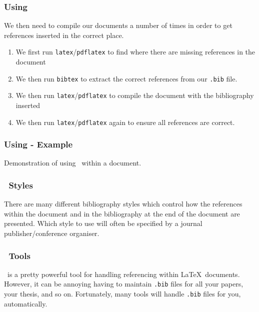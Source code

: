 \documentclass[mathserif]{beamer}
\begin{document}
\begin{frame}[fragile]
\frametitle{Using \BibTeX}

\vfill
We then need to compile our documents a number of times in order to get references inserted in the correct place.
\begin{enumerate}
	\item We first run \texttt{latex}/\texttt{pdflatex} to find where there are missing references in the document
	\item We then run \texttt{bibtex} to extract the correct references from our \texttt{.bib} file.
	\item We then run \texttt{latex}/\texttt{pdflatex} to compile the document with the bibliography inserted
	\item We then run \texttt{latex}/\texttt{pdflatex} again to ensure all references are correct.
\end{enumerate}
\vfill

\end{frame}


\begin{frame}[fragile]
\frametitle{Using \BibTeX - Example}

\vfill
Demonstration of using \BibTeX\ within a document.
\vfill

\end{frame}

\begin{frame}[fragile]
\frametitle{\BibTeX\ Styles}

\vfill
There are many different bibliography styles which control how the references within the document and in the bibliography at the end of the document are presented.
\vfill
Which style to use will often be specified by a journal publisher/conference organiser.
\vfill

\end{frame}

\begin{frame}[fragile]
\frametitle{\BibTeX\ Tools}

\vfill
\BibTeX\ is a pretty powerful tool for handling referencing within \LaTeX\ documents.
\vfill
However, it can be annoying having to maintain \texttt{.bib} files for all your papers, your thesis, and so on.
\vfill
Fortunately, many tools will handle \texttt{.bib} files for you, automatically.
\vfill

\end{frame}
\end{document}
